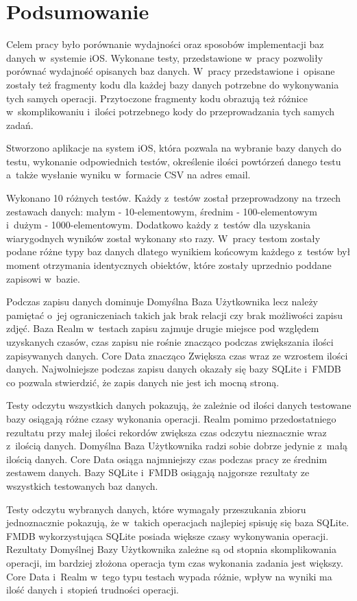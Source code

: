 \section{Podsumowanie}

Celem pracy było porównanie wydajności oraz sposobów implementacji baz danych w~systemie iOS. Wykonane testy, przedstawione w~pracy pozwoliły porównać wydajność opisanych  baz danych. W~pracy przedstawione i~opisane zostały też fragmenty kodu dla każdej bazy danych potrzebne do wykonywania tych samych operacji. Przytoczone fragmenty kodu obrazują też różnice w~skomplikowaniu i~ilości potrzebnego kody do przeprowadzania tych samych zadań. 

Stworzono aplikacje na system iOS, która pozwala na wybranie bazy danych do testu, wykonanie odpowiednich testów, określenie ilości powtórzeń danego testu a~także wysłanie wyniku w~formacie CSV na adres email. 

Wykonano 10 różnych testów. Każdy z~testów został przeprowadzony na trzech zestawach danych: małym - 10-elementowym, średnim - 100-elementowym i~dużym - 1000-elementowym. Dodatkowo każdy z~testów dla uzyskania wiarygodnych wyników został wykonany sto razy. W~pracy testom zostały podane różne typy baz danych dlatego wynikiem końcowym każdego z~testów był moment otrzymania identycznych obiektów, które zostały uprzednio poddane zapisowi w~bazie. 

Podczas zapisu danych dominuje Domyślna Baza Użytkownika lecz należy pamiętać o~jej ograniczeniach takich jak brak relacji czy brak możliwości zapisu zdjęć. Baza Realm w~testach zapisu zajmuje drugie miejsce pod względem uzyskanych czasów, czas zapisu nie rośnie znacząco podczas zwiększania ilości zapisywanych danych. Core Data znacząco Zwiększa czas wraz ze wzrostem ilości danych. Najwolniejsze podczas zapisu danych okazały się bazy SQLite i~FMDB co pozwala stwierdzić, że zapis danych nie jest ich mocną stroną. 

Testy odczytu wszystkich danych pokazują, że zależnie od ilości danych testowane bazy osiągają różne czasy wykonania operacji. Realm pomimo przedostatniego rezultatu przy małej ilości rekordów zwiększa czas odczytu nieznacznie wraz z~ilością danych. Domyślna Baza Użytkownika radzi sobie dobrze jedynie z~małą ilością danych. Core Data osiąga najmniejszy czas podczas pracy ze średnim zestawem danych. Bazy SQLite i~FMDB osiągają najgorsze rezultaty ze wszystkich testowanych baz danych. 

Testy odczytu wybranych danych, które wymagały przeszukania zbioru jednoznacznie pokazują, że w~takich operacjach najlepiej spisuję się baza SQLite. FMDB wykorzystująca SQLite posiada większe czasy wykonywania operacji. Rezultaty Domyślnej Bazy Użytkownika zależne są od stopnia skomplikowania operacji, im bardziej złożona operacja tym czas wykonania zadania jest większy. Core Data i~Realm w~tego typu testach wypada różnie, wpływ na wyniki ma ilość danych i~stopień trudności operacji.

